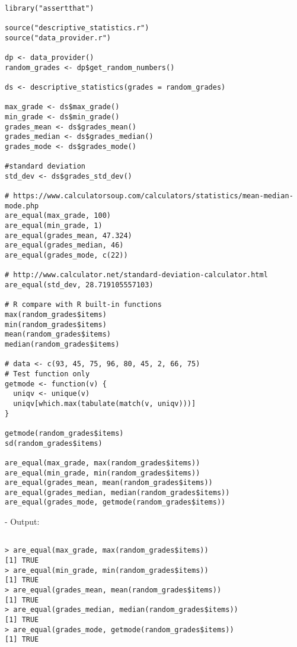 \documentclass[11pt]{article}
\begin{document}
\begin{lstlisting}

library("assertthat")

source("descriptive_statistics.r")
source("data_provider.r")

dp <- data_provider()
random_grades <- dp$get_random_numbers()

ds <- descriptive_statistics(grades = random_grades)

max_grade <- ds$max_grade()
min_grade <- ds$min_grade()
grades_mean <- ds$grades_mean()
grades_median <- ds$grades_median()
grades_mode <- ds$grades_mode()

#standard deviation
std_dev <- ds$grades_std_dev()

# https://www.calculatorsoup.com/calculators/statistics/mean-median-mode.php
are_equal(max_grade, 100)
are_equal(min_grade, 1)
are_equal(grades_mean, 47.324)
are_equal(grades_median, 46)
are_equal(grades_mode, c(22))

# http://www.calculator.net/standard-deviation-calculator.html
are_equal(std_dev, 28.719105557103)

# R compare with R built-in functions
max(random_grades$items)
min(random_grades$items)
mean(random_grades$items)
median(random_grades$items)

# data <- c(93, 45, 75, 96, 80, 45, 2, 66, 75)
# Test function only
getmode <- function(v) {
  uniqv <- unique(v)
  uniqv[which.max(tabulate(match(v, uniqv)))]
}

getmode(random_grades$items)
sd(random_grades$items)

are_equal(max_grade, max(random_grades$items))
are_equal(min_grade, min(random_grades$items))
are_equal(grades_mean, mean(random_grades$items))
are_equal(grades_median, median(random_grades$items))
are_equal(grades_mode, getmode(random_grades$items))

\end{lstlisting}

- Output:

\begin{lstlisting}

> are_equal(max_grade, max(random_grades$items))
[1] TRUE
> are_equal(min_grade, min(random_grades$items))
[1] TRUE
> are_equal(grades_mean, mean(random_grades$items))
[1] TRUE
> are_equal(grades_median, median(random_grades$items))
[1] TRUE
> are_equal(grades_mode, getmode(random_grades$items))
[1] TRUE

\end{lstlisting}
\end{document}
